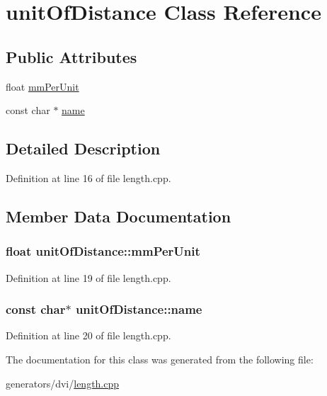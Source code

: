 \hypertarget{classunitOfDistance}{\section{unit\+Of\+Distance Class Reference}
\label{classunitOfDistance}
}
\subsection*{Public Attributes}
\begin{DoxyCompactItemize}
\item 
float \hyperlink{classunitOfDistance_afb87d96ebc2f35fcd0a76ba841e0e31e}{mm\+Per\+Unit}
\item 
const char $\ast$ \hyperlink{classunitOfDistance_af9c2a1bf8c2478cab75d23deafb35242}{name}
\end{DoxyCompactItemize}


\subsection{Detailed Description}


Definition at line 16 of file length.\+cpp.



\subsection{Member Data Documentation}
\hypertarget{classunitOfDistance_afb87d96ebc2f35fcd0a76ba841e0e31e}{
\subsubsection[{mm\+Per\+Unit}]{\setlength{\rightskip}{0pt plus 5cm}float unit\+Of\+Distance\+::mm\+Per\+Unit}}\label{classunitOfDistance_afb87d96ebc2f35fcd0a76ba841e0e31e}


Definition at line 19 of file length.\+cpp.

\hypertarget{classunitOfDistance_af9c2a1bf8c2478cab75d23deafb35242}{
\subsubsection[{name}]{\setlength{\rightskip}{0pt plus 5cm}const char$\ast$ unit\+Of\+Distance\+::name}}\label{classunitOfDistance_af9c2a1bf8c2478cab75d23deafb35242}


Definition at line 20 of file length.\+cpp.



The documentation for this class was generated from the following file\+:\begin{DoxyCompactItemize}
\item 
generators/dvi/\hyperlink{length_8cpp}{length.\+cpp}\end{DoxyCompactItemize}
